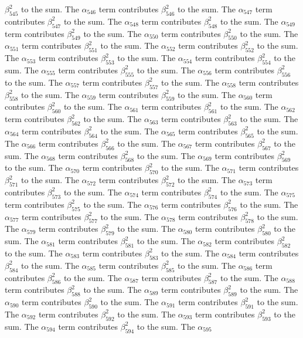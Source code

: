 \begin{lemma}
$\beta_{545}^{2}$ to the sum. The $\alpha_{546}$ term contributes $\beta_{546}^{2}$ to the sum. The $\alpha_{547}$ term contributes $\beta_{547}^{2}$ to the sum. The $\alpha_{548}$ term contributes $\beta_{548}^{2}$ to the sum. The $\alpha_{549}$ term contributes $\beta_{549}^{2}$ to the sum. The $\alpha_{550}$ term contributes $\beta_{550}^{2}$ to the sum. The $\alpha_{551}$ term contributes $\beta_{551}^{2}$ to the sum. The $\alpha_{552}$ term contributes $\beta_{552}^{2}$ to the sum. The $\alpha_{553}$ term contributes $\beta_{553}^{2}$ to the sum. The $\alpha_{554}$ term contributes $\beta_{554}^{2}$ to the sum. The $\alpha_{555}$ term contributes $\beta_{555}^{2}$ to the sum. The $\alpha_{556}$ term contributes $\beta_{556}^{2}$ to the sum. The $\alpha_{557}$ term contributes $\beta_{557}^{2}$ to the sum. The $\alpha_{558}$ term contributes $\beta_{558}^{2}$ to the sum. The $\alpha_{559}$ term contributes $\beta_{559}^{2}$ to the sum. The $\alpha_{560}$ term contributes $\beta_{560}^{2}$ to the sum. The $\alpha_{561}$ term contributes $\beta_{561}^{2}$ to the sum. The $\alpha_{562}$ term contributes $\beta_{562}^{2}$ to the sum. The $\alpha_{563}$ term contributes $\beta_{563}^{2}$ to the sum. The $\alpha_{564}$ term contributes $\beta_{564}^{2}$ to the sum. The $\alpha_{565}$ term contributes $\beta_{565}^{2}$ to the sum. The $\alpha_{566}$ term contributes $\beta_{566}^{2}$ to the sum. The $\alpha_{567}$ term contributes $\beta_{567}^{2}$ to the sum. The $\alpha_{568}$ term contributes $\beta_{568}^{2}$ to the sum. The $\alpha_{569}$ term contributes $\beta_{569}^{2}$ to the sum. The $\alpha_{570}$ term contributes $\beta_{570}^{2}$ to the sum. The $\alpha_{571}$ term contributes $\beta_{571}^{2}$ to the sum. The $\alpha_{572}$ term contributes $\beta_{572}^{2}$ to the sum. The $\alpha_{573}$ term contributes $\beta_{573}^{2}$ to the sum. The $\alpha_{574}$ term contributes $\beta_{574}^{2}$ to the sum. The $\alpha_{575}$ term contributes $\beta_{575}^{2}$ to the sum. The $\alpha_{576}$ term contributes $\beta_{576}^{2}$ to the sum. The $\alpha_{577}$ term contributes $\beta_{577}^{2}$ to the sum. The $\alpha_{578}$ term contributes $\beta_{578}^{2}$ to the sum. The $\alpha_{579}$ term contributes $\beta_{579}^{2}$ to the sum. The $\alpha_{580}$ term contributes $\beta_{580}^{2}$ to the sum. The $\alpha_{581}$ term contributes $\beta_{581}^{2}$ to the sum. The $\alpha_{582}$ term contributes $\beta_{582}^{2}$ to the sum. The $\alpha_{583}$ term contributes $\beta_{583}^{2}$ to the sum. The $\alpha_{584}$ term contributes $\beta_{584}^{2}$ to the sum. The $\alpha_{585}$ term contributes $\beta_{585}^{2}$ to the sum. The $\alpha_{586}$ term contributes $\beta_{586}^{2}$ to the sum. The $\alpha_{587}$ term contributes $\beta_{587}^{2}$ to the sum. The $\alpha_{588}$ term contributes $\beta_{588}^{2}$ to the sum. The $\alpha_{589}$ term contributes $\beta_{589}^{2}$ to the sum. The $\alpha_{590}$ term contributes $\beta_{590}^{2}$ to the sum. The $\alpha_{591}$ term contributes $\beta_{591}^{2}$ to the sum. The $\alpha_{592}$ term contributes $\beta_{592}^{2}$ to the sum. The $\alpha_{593}$ term contributes $\beta_{593}^{2}$ to the sum. The $\alpha_{594}$ term contributes $\beta_{594}^{2}$ to the sum. The $\alpha_{595}$ 
\end{lemma}
